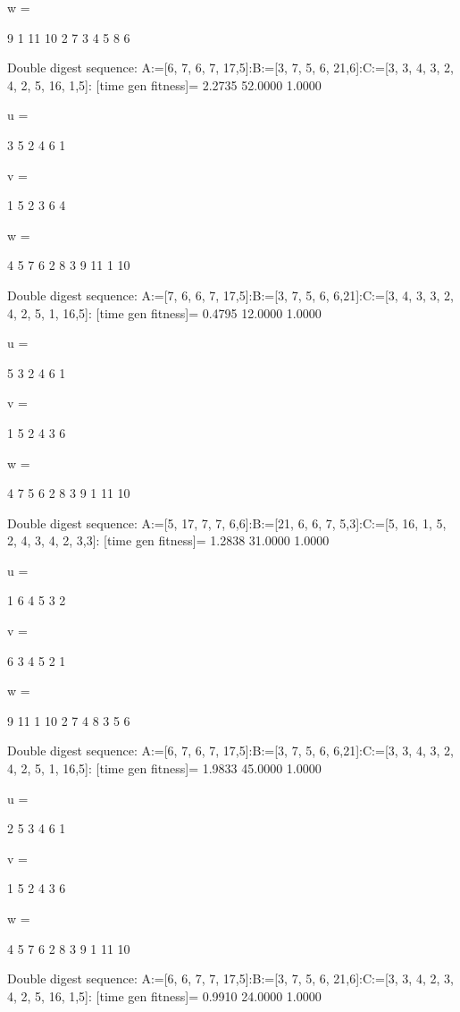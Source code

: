 w =

     9     1    11    10     2     7     3     4     5     8     6

Double digest sequence:
A:=[6, 7, 6, 7, 17,5]:B:=[3, 7, 5, 6, 21,6]:C:=[3, 3, 4, 3, 2, 4, 2, 5, 16, 1,5]:
[time gen fitness]=
    2.2735   52.0000    1.0000


u =

     3     5     2     4     6     1


v =

     1     5     2     3     6     4


w =

     4     5     7     6     2     8     3     9    11     1    10

Double digest sequence:
A:=[7, 6, 6, 7, 17,5]:B:=[3, 7, 5, 6, 6,21]:C:=[3, 4, 3, 3, 2, 4, 2, 5, 1, 16,5]:
[time gen fitness]=
    0.4795   12.0000    1.0000


u =

     5     3     2     4     6     1


v =

     1     5     2     4     3     6


w =

     4     7     5     6     2     8     3     9     1    11    10

Double digest sequence:
A:=[5, 17, 7, 7, 6,6]:B:=[21, 6, 6, 7, 5,3]:C:=[5, 16, 1, 5, 2, 4, 3, 4, 2, 3,3]:
[time gen fitness]=
    1.2838   31.0000    1.0000


u =

     1     6     4     5     3     2


v =

     6     3     4     5     2     1


w =

     9    11     1    10     2     7     4     8     3     5     6

Double digest sequence:
A:=[6, 7, 6, 7, 17,5]:B:=[3, 7, 5, 6, 6,21]:C:=[3, 3, 4, 3, 2, 4, 2, 5, 1, 16,5]:
[time gen fitness]=
    1.9833   45.0000    1.0000


u =

     2     5     3     4     6     1


v =

     1     5     2     4     3     6


w =

     4     5     7     6     2     8     3     9     1    11    10

Double digest sequence:
A:=[6, 6, 7, 7, 17,5]:B:=[3, 7, 5, 6, 21,6]:C:=[3, 3, 4, 2, 3, 4, 2, 5, 16, 1,5]:
[time gen fitness]=
    0.9910   24.0000    1.0000


